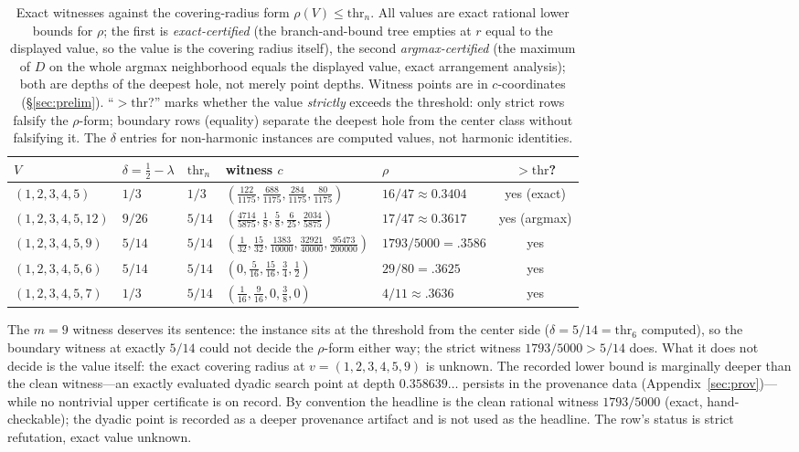 \documentclass[11pt,a4paper]{article}
\numberwithin{equation}{section}
\theoremstyle{plain}
\theoremstyle{definition}
\theoremstyle{remark}
\begin{document}
\begin{table}[htbp]
\centering
\footnotesize
\caption{Exact witnesses against the covering-radius form
$\rho(V)\le\mathrm{thr}_n$. All values are exact rational lower bounds
for $\rho$; the first is \emph{exact-certified} (the branch-and-bound
tree empties at $r$ equal to the displayed value, so the value is the
covering radius itself), the second \emph{argmax-certified} (the
maximum of $D$ on the whole argmax neighborhood equals the displayed
value, exact arrangement analysis); both are depths of the deepest
hole, not merely point depths. Witness points are in $c$-coordinates
(\S\ref{sec:prelim}). ``$>\mathrm{thr}$?'' marks whether the value
\emph{strictly} exceeds the threshold: only strict rows falsify the
$\rho$-form; boundary rows (equality) separate the deepest hole from
the center class without falsifying it. The $\delta$ entries for
non-harmonic instances are computed values, not harmonic identities.}
\label{tab:refute}
\begin{tabularx}{\textwidth}{@{} l l l >{\raggedright\arraybackslash}X l c @{}}
\toprule
$V$ & $\delta=\tfrac12-\lambda$ & $\mathrm{thr}_n$ & witness $c$ &
$\rho$ & $>\mathrm{thr}$? \\
\midrule
$(1,2,3,4,5)$ & $1/3$ & $1/3$ &
$(\tfrac{122}{1175},\tfrac{688}{1175},\tfrac{284}{1175},
\tfrac{80}{1175})$ &
$16/47\approx0.3404$ & yes (exact) \\
$(1,2,3,4,5,12)$ & $9/26$ & $5/14$ &
$(\tfrac{4714}{5875},\tfrac18,\tfrac58,\tfrac6{25},
\tfrac{2034}{5875})$ &
$17/47\approx0.3617$ & yes (argmax) \\
$(1,2,3,4,5,9)$ & $5/14$ & $5/14$ &
$(\tfrac1{32},\tfrac{15}{32},\tfrac{1383}{10000},
\tfrac{32921}{40000},\tfrac{95473}{200000})$ &
$1793/5000=.3586$ & yes \\
$(1,2,3,4,5,6)$ & $5/14$ & $5/14$ &
$(0,\tfrac5{16},\tfrac{15}{16},\tfrac34,\tfrac12)$ & $29/80=.3625$ &
yes \\
$(1,2,3,4,5,7)$ & $1/3$ & $5/14$ &
$(\tfrac1{16},\tfrac9{16},0,\tfrac38,0)$ & $4/11{\approx}.3636$ & yes
\\
\bottomrule
\end{tabularx}
\end{table}

The $m=9$ witness deserves its sentence: the instance sits at the
threshold from the center side ($\delta=5/14=\mathrm{thr}_6$ computed),
so the boundary witness at exactly $5/14$ could not decide the
$\rho$-form either way; the strict witness $1793/5000>5/14$ does. What
it does not decide is the value itself: the exact covering radius at
$v=(1,2,3,4,5,9)$ is unknown. The recorded lower bound is marginally
deeper than the clean witness---an exactly evaluated dyadic search
point at depth $0.358639\ldots$ persists in the provenance data
(Appendix~\ref{sec:prov})---while no nontrivial upper certificate is
on record. By convention the headline is the clean rational witness
$1793/5000$ (exact, hand-checkable); the dyadic point is recorded as a
deeper provenance artifact and is not used as the headline. The row's
status is strict refutation, exact value unknown.
\end{document}
